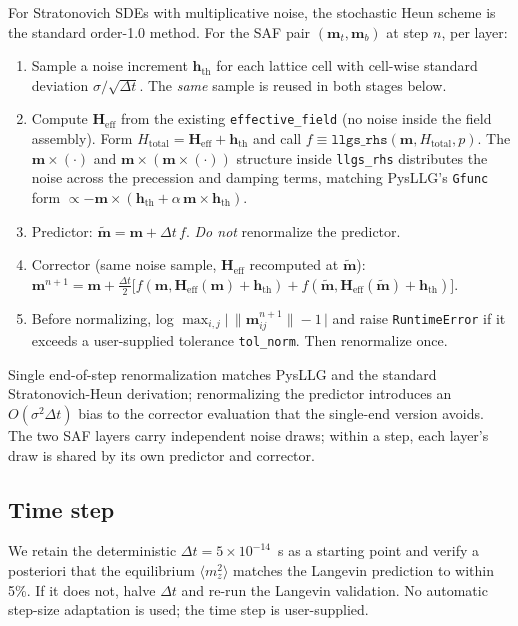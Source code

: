 \documentclass[11pt,a4paper]{article}
\newcommand{\mb}[1]{\mathbf{#1}}
\newcommand{\Heff}{\mb{H}_{\text{eff}}}
\newcommand{\hth}{\mb{h}_{\text{th}}}
\begin{document}
For Stratonovich SDEs with multiplicative noise, the stochastic Heun
scheme is the standard order-1.0 method. For the SAF pair
$(\mb{m}_t, \mb{m}_b)$ at step $n$, per layer:
%
\begin{enumerate}[leftmargin=2em]
    \item Sample a noise increment $\hth$ for each lattice cell with
    cell-wise standard deviation $\sigma / \sqrt{\Delta t}$. The
    \emph{same} sample is reused in both stages below.
    \item Compute $\Heff$ from the existing
    \texttt{effective\_field} (no noise inside the field assembly).
    Form $H_{\text{total}} = \Heff + \hth$ and call
    $f \equiv \texttt{llgs\_rhs}(\mb{m}, H_{\text{total}}, p)$.
    The $\mb{m}\times(\cdot)$ and $\mb{m}\times(\mb{m}\times(\cdot))$
    structure inside \texttt{llgs\_rhs} distributes the noise across
    the precession and damping terms, matching PysLLG's \texttt{Gfunc}
    form $\propto -\mb{m}\times(\hth + \alpha\, \mb{m}\times\hth)$.
    \item Predictor: $\tilde{\mb{m}} = \mb{m} + \Delta t \, f$.
    \emph{Do not} renormalize the predictor.
    \item Corrector (same noise sample, $\Heff$ recomputed at
    $\tilde{\mb{m}}$):
    $\mb{m}^{n+1} = \mb{m} + \tfrac{\Delta t}{2}
    \big[ f(\mb{m}, \Heff(\mb{m}) + \hth) +
          f(\tilde{\mb{m}}, \Heff(\tilde{\mb{m}}) + \hth) \big]$.
    \item Before normalizing, log
    $\max_{i,j} \big|\,\|\mb{m}^{n+1}_{ij}\| - 1\,\big|$ and raise
    \texttt{RuntimeError} if it exceeds a user-supplied tolerance
    \texttt{tol\_norm}. Then renormalize once.
\end{enumerate}
%
Single end-of-step renormalization matches PysLLG and the standard
Stratonovich-Heun derivation; renormalizing the predictor introduces
an $O(\sigma^2 \Delta t)$ bias to the corrector evaluation that the
single-end version avoids. The two SAF layers carry independent
noise draws; within a step, each layer's draw is shared by its own
predictor and corrector.

\subsection{Time step}

We retain the deterministic $\Delta t = 5\times 10^{-14}$~s as a
starting point and verify a posteriori that the equilibrium
$\langle m_z^2 \rangle$ matches the Langevin prediction to within
5\%. If it does not, halve $\Delta t$ and re-run the Langevin
validation. No automatic step-size adaptation is used; the time step
is user-supplied.
\end{document}
